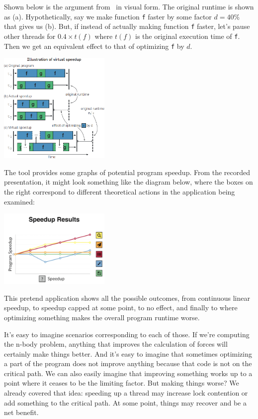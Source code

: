 Shown below is the argument from~\cite{coz} in visual form. The original runtime is shown as (a). Hypothetically, say we make function \texttt{f} faster by some factor $d = 40\%$ that gives us (b). But, if instead of actually making function \texttt{f} faster, let's pause other threads for $0.4 \times t(f)$ where $t(f)$ is the original execution time of \texttt{f}. Then we get an equivalent effect to that of optimizing \texttt{f} by $d$.
\begin{center}
	\includegraphics[width=0.4\textwidth]{images/virtual-speedup.jpg}
\end{center}

The tool provides some graphs of potential program speedup. From the recorded presentation, it might look something like the diagram below, where the boxes on the right correspond to different theoretical actions in the application being examined:

\begin{center}
	\includegraphics[width=0.4\textwidth]{images/coz-speedup-graph.png}
\end{center}

This pretend application shows all the possible outcomes, from continuous linear speedup, to speedup capped at some point, to no effect, and finally to where optimizing something makes the overall program runtime worse. 

It's easy to imagine scenarios corresponding to each of those. If we're computing the n-body problem, anything that improves the calculation of forces will certainly make things better. And it's easy to imagine that sometimes optimizing a part of the program does not improve anything because that code is not on the critical path. We can also easily imagine that improving something works up to a point where it ceases to be the limiting factor. But making things worse? We already covered that idea: speeding up a thread may increase lock contention or add something to the critical path. At some point, things may recover and be a net benefit.

